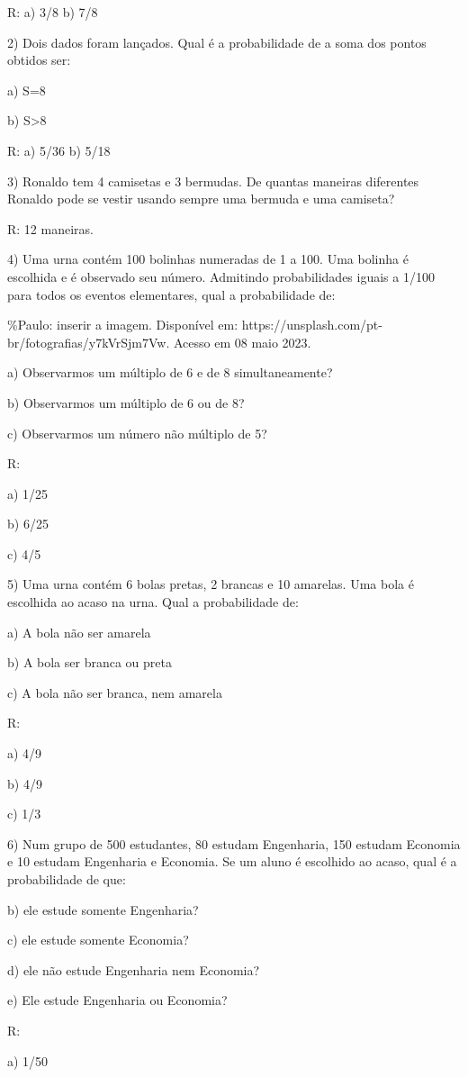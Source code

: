 R: a) 3/8 b) 7/8

2) Dois dados foram lançados. Qual é a probabilidade de a soma dos
pontos obtidos ser:

a) S=8

b) S\textgreater8

R: a) 5/36 b) 5/18

3) Ronaldo tem 4 camisetas e 3 bermudas. De quantas maneiras diferentes
Ronaldo pode se vestir usando sempre uma bermuda e uma camiseta?

R: 12 maneiras.

4) Uma urna contém 100 bolinhas numeradas de 1 a 100. Uma bolinha é
escolhida e é observado seu número. Admitindo probabilidades iguais a
1/100 para todos os eventos elementares, qual a probabilidade de:

\%Paulo: inserir a imagem. Disponível em:
https://unsplash.com/pt-br/fotografias/y7kVrSjm7Vw. Acesso em 08 maio
2023.

a) Observarmos um múltiplo de 6 e de 8 simultaneamente?

b) Observarmos um múltiplo de 6 ou de 8?

c) Observarmos um número não múltiplo de 5?

R:

a) 1/25

b) 6/25

c) 4/5

5) Uma urna contém 6 bolas pretas, 2 brancas e 10 amarelas. Uma bola é
escolhida ao acaso na urna. Qual a probabilidade de:

a) A bola não ser amarela

b) A bola ser branca ou preta

c) A bola não ser branca, nem amarela

R:

a) 4/9

b) 4/9

c) 1/3

6) Num grupo de 500 estudantes, 80 estudam Engenharia, 150 estudam
Economia e 10 estudam Engenharia e Economia. Se um aluno é escolhido ao
acaso, qual é a probabilidade de que:

b) ele estude somente Engenharia?

c) ele estude somente Economia?

d) ele não estude Engenharia nem Economia?

e) Ele estude Engenharia ou Economia?

R:

a) 1/50

